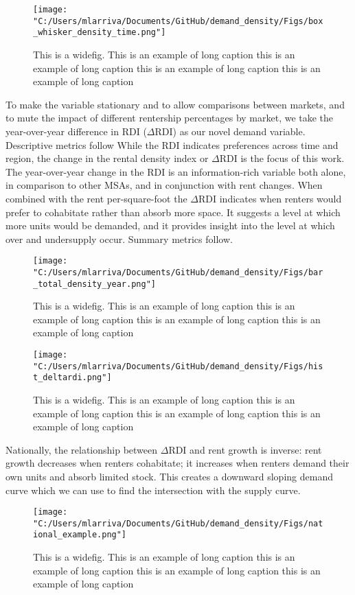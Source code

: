 \documentclass[sn-mathphys-num]{sn-jnl}%
\theoremstyle{thmstyleone}%
\theoremstyle{thmstyletwo}%
\theoremstyle{thmstylethree}%
\begin{document}
\begin{figure}[H]
	\centering
	\texttt{[image: "C:/Users/mlarriva/Documents/GitHub/demand\_density/Figs/box\_whisker\_density\_time.png"]}
	\caption{This is a widefig. This is an example of long caption this is an example of long caption  this is an example of long caption this is an example of long caption}\label{fig1}
\end{figure}
To make the variable stationary and to allow comparisons between markets, and to mute the impact of different rentership percentages by market, we take the year-over-year difference in RDI ($\Delta\text{RDI}$) as our novel demand variable. Descriptive metrics follow
While the RDI indicates preferences across time and region, the change in the rental density index or $\Delta\text{RDI}$ is the focus of this work. The year-over-year change in the RDI is an information-rich variable both alone, in comparison to other MSAs, and in conjunction with rent changes. When combined with the rent per-square-foot the $\Delta\text{RDI}$ indicates when renters would prefer to cohabitate rather than absorb more space. It suggests a level at which more units would be demanded, and it provides insight into the level at which over and undersupply occur. 
Summary metrics follow.
\begin{figure}[H]
	\centering
	\texttt{[image: "C:/Users/mlarriva/Documents/GitHub/demand\_density/Figs/bar\_total\_density\_year.png"]}
	\caption{This is a widefig. This is an example of long caption this is an example of long caption  this is an example of long caption this is an example of long caption}\label{fig2}
\end{figure}
\begin{figure}[H]
	\centering
	\texttt{[image: "C:/Users/mlarriva/Documents/GitHub/demand\_density/Figs/hist\_deltardi.png"]}
	\caption{This is a widefig. This is an example of long caption this is an example of long caption  this is an example of long caption this is an example of long caption}\label{fig3}
\end{figure}

Nationally, the relationship between $\Delta\text{RDI}$ and rent growth is inverse: rent growth decreases when renters cohabitate; it increases when renters demand their own units and absorb limited stock. This creates a downward sloping demand curve which we can use to find the intersection with the supply curve. 

\begin{figure}[H]
	\centering
	\texttt{[image: "C:/Users/mlarriva/Documents/GitHub/demand\_density/Figs/national\_example.png"]}
	\caption{This is a widefig. This is an example of long caption this is an example of long caption  this is an example of long caption this is an example of long caption}\label{fig4}
\end{figure}
\end{document}
